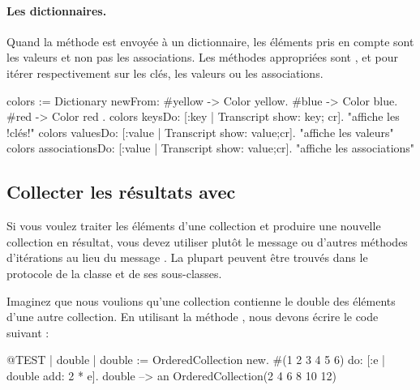 \documentclass[a4paper,10pt,twoside]{book}
\begin{document}


\paragraph{Les dictionnaires.}
Quand la m\'ethode  est envoy\'ee \`a un dictionnaire,
les \'el\'ements pris en compte sont les valeurs et non pas les associations.
Les m\'ethodes appropri\'ees sont ,  et  pour it\'erer respectivement sur les cl\'es, les valeurs ou les associations.

\begin{code}{}
colors := Dictionary newFrom: { #yellow -> Color yellow. #blue -> Color blue. #red -> Color red }.
colors keysDo: [:key | Transcript show: key; cr].                    "affiche les !cl\'es!"
colors valuesDo: [:value | Transcript show: value;cr].            "affiche les valeurs"
colors associationsDo: [:value | Transcript show: value;cr].  "affiche les associations"
\end{code}

\subsection{Collecter les r\'esultats avec }
Si vous voulez traiter les \'el\'ements d'une collection et produire
une nouvelle collection en r\'esultat, vous devez utiliser plut\^ot le
message  ou d'autres m\'ethodes d'it\'erations au lieu
du message .
La plupart peuvent \^etre trouv\'es dans le protocole  
de la classe  et de ses sous-classes.

Imaginez que nous voulions qu'une collection contienne le double des \'el\'ements d'une autre collection. 
En utilisant la m\'ethode , nous devons \'ecrire le code suivant :

\begin{code}{@TEST | double |}
double := OrderedCollection new.
#(1 2 3 4 5 6) do: [:e | double add: 2 * e].
double --> an OrderedCollection(2 4 6 8 10 12)
\end{code}
\end{document}
